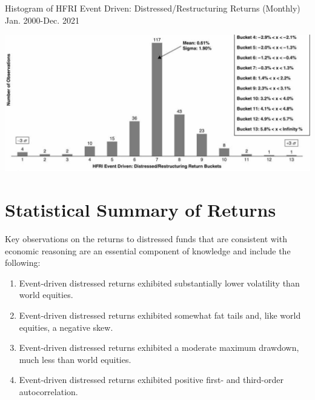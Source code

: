 \documentclass[11pt]{article}
\begin{document}
Histogram of HFRI Event Driven: Distressed/Restructuring Returns (Monthly) Jan. 2000-Dec. 2021

\begin{center}
\includegraphics[max width=\textwidth]{2024_04_09_96054006c4d1a1e0ab8bg-5(1)}
\end{center}

\section*{Statistical Summary of Returns}
Key observations on the returns to distressed funds that are consistent with economic reasoning are an essential component of knowledge and include the following:

\begin{enumerate}
  \item Event-driven distressed returns exhibited substantially lower volatility than world equities.

  \item Event-driven distressed returns exhibited somewhat fat tails and, like world equities, a negative skew.

  \item Event-driven distressed returns exhibited a moderate maximum drawdown, much less than world equities.

  \item Event-driven distressed returns exhibited positive first- and third-order autocorrelation.

\end{enumerate}
\end{document}
